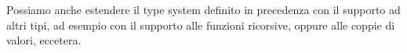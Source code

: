 Possiamo anche estendere il type system definito in precedenza con il supporto ad altri tipi, ad esempio con il supporto alle funzioni ricorsive, oppure alle coppie di valori, eccetera.



